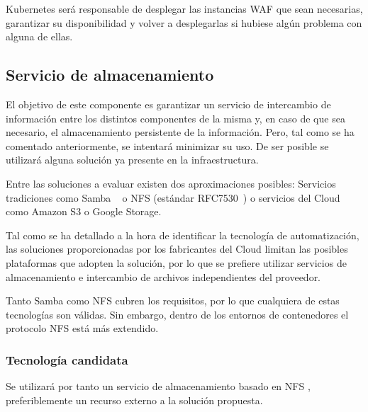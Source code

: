 \par Kubernetes será responsable de desplegar las instancias WAF que sean necesarias, garantizar su disponibilidad y volver a desplegarlas si hubiese algún problema con alguna de ellas.

\subsection{Servicio de almacenamiento}
\par El objetivo de este componente es garantizar un servicio de intercambio de información entre los distintos componentes de la misma y, en caso de que sea
necesario, el almacenamiento persistente de la información. Pero, tal como se ha comentado anteriormente, se intentará minimizar su uso. De ser posible se
utilizará alguna solución ya presente en la infraestructura.
\par Entre las soluciones a evaluar existen dos aproximaciones posibles: Servicios tradiciones como Samba ~\cite{samba} o  NFS (estándar RFC7530~\cite{nfs}) o
servicios del Cloud como Amazon S3\cite{s3} o Google Storage\cite{GoogleStorage}.

\par Tal como se ha detallado a la hora de identificar la tecnología de automatización, las soluciones proporcionadas por los fabricantes del Cloud limitan
las posibles plataformas que adopten la solución, por lo que se prefiere utilizar servicios de almacenamiento e intercambio de archivos independientes del
proveedor.
\par Tanto Samba como NFS cubren los requisitos, por lo que cualquiera de estas tecnologías son válidas. Sin embargo, dentro de los entornos de contenedores el
protocolo NFS está más extendido.

\subsubsection{Tecnología candidata}
\par Se utilizará por tanto un servicio de almacenamiento basado en NFS \cite{nfs}, preferiblemente un recurso externo a la solución propuesta.

